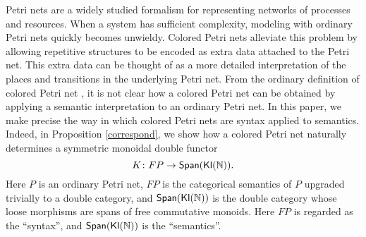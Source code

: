 Petri nets are a widely studied formalism for representing networks of processes and resources. When a system has sufficient complexity, modeling with ordinary Petri nets quickly becomes unwieldy. Colored Petri nets alleviate this problem by allowing repetitive structures to be encoded as extra data attached to the Petri net. This extra data can be thought of as a more detailed interpretation of the places and transitions in the underlying Petri net. From the ordinary definition of colored Petri net \cite{jensen2013coloured}, it is not clear how a colored Petri net can be obtained by applying a semantic interpretation to an ordinary Petri net. In this paper, we make precise the way in which colored Petri nets are syntax applied to semantics. Indeed, in Proposition \ref{correspond}, we show how a colored Petri net naturally determines a symmetric monoidal double functor
\[ K \colon FP \to \mathsf{Span}(\mathsf{\mathsf{Kl}(\mathbb{N}) }). \]
Here $P$ is an ordinary Petri net, 
$FP$ is the categorical semantics of $P$ upgraded trivially to a double category, and $\mathsf{Span}(\mathsf{\mathsf{Kl}(\mathbb{N}) })$ is the double category whose loose morphisms are spans of free commutative monoids. Here $FP$ is regarded as the ``syntax'', and $\mathsf{Span}(\mathsf{\mathsf{Kl}(\mathbb{N}) })$ is the ``semantics''.

